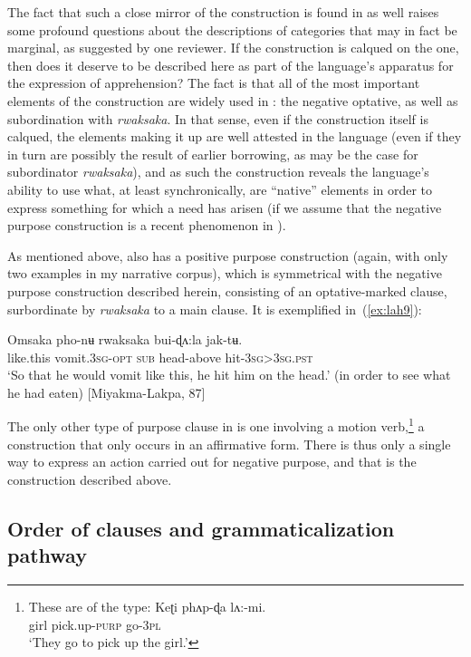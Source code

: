 \documentclass[output=paper,colorlinks,citecolor=brown]{langscibook}
\begin{document}
The fact that such a close mirror of the construction is found in  as well raises some profound questions about the descriptions of categories that may in fact be marginal, as suggested by one reviewer. If the  construction is calqued on the  one, then does it deserve to be described here as part of the language's apparatus for the expression of apprehension? The fact is that all of the most important elements of the construction are widely used in : the negative optative, as well as subordination with \textit{rwaksaka}. In that sense, even if the construction itself is calqued, the elements making it up are well attested in the language (even if they in turn are possibly the result of earlier borrowing, as may be the case for subordinator \textit{rwaksaka}), and as such the construction reveals the language's ability to use what, at least synchronically, are ``native'' elements in order to express something for which a need has arisen (if we assume that the negative purpose construction is a recent phenomenon in ).

As mentioned above,  also has a positive purpose construction (again, with only two examples in my narrative corpus), which is symmetrical with the negative purpose construction described herein, consisting of an optative-marked clause, surbordinate by \textit{rwaksaka} to a main clause. It is exemplified in~(\ref{ex:lah9}):


\ea \label{ex:lah9}
\gll Omsaka pho-nʉ rwaksaka bui-ɖʌ:la jak-tʉ. \\
like.this vomit.\textsc{3sg-opt} \textsc{sub}  head-above hit-\textsc{3sg>3sg.pst} \\
\glt `So that he would vomit like this, he hit him on the head.' (in order to see what he had eaten) [Miyakma-Lakpa, 87]
\z

The only other type of purpose clause in  is one involving a motion verb,\footnote{These are of the type:
\ea \label{footnoteex3}
\gll Keʈi phʌp-ɖa lʌ:-mi. \\
girl pick.up-\textsc{purp} go-\textsc{3pl} \\
\glt `They go to pick up the girl.'
\z} a construction that only occurs in an affirmative form. There is thus only a single way to express an action carried out for negative purpose, and that is the construction described above.



\subsection{Order of clauses and grammaticalization pathway}
\label{subsec:order}
\end{document}
